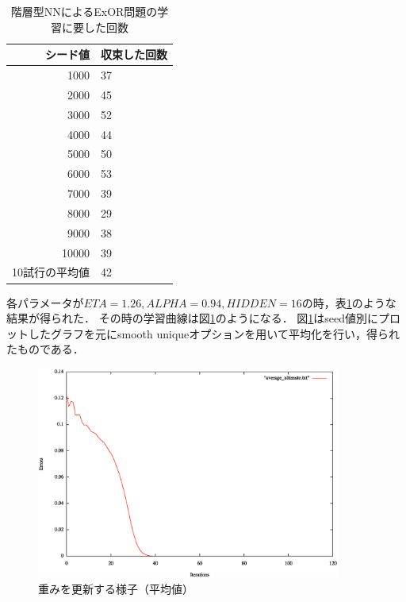 \begin{table}[htb]
 \begin{center}
  \begin{tabular}[htb]{|r|l|} \hline
   シード値 & 収束した回数 \\ \hline \hline
   1000     & 37\\ \hline
   2000     & 45\\ \hline
   3000     & 52\\ \hline
   4000     & 44\\ \hline
   5000     & 50\\ \hline
   6000     & 53\\ \hline
   7000     & 39\\ \hline
   8000     & 29\\ \hline
   9000     & 38\\ \hline
   10000    & 39 \\ \hline \hline
   10試行の平均値 & 42 \\ \hline
  \end{tabular}
  \caption{階層型NNによるExOR問題の学習に要した回数}
  \label{table:level2}
 \end{center}
\end{table}

各パラメータが$ETA=1.26, ALPHA=0.94, HIDDEN=16$の時，表\ref{table:level2}のような結果が得られた．
その時の学習曲線は図\ref{fig:averageultimate}のようになる．
図\ref{fig:averageultimate}はseed値別にプロットしたグラフを元にsmooth uniqueオプションを用いて平均化を行い，得られたものである．

\begin{figure}[h]
 \begin{center}
  \includegraphics[width=10.0cm]{./level2figs/averageultimate.eps}
  \caption{重みを更新する様子（平均値）}
  \label{fig:averageultimate}
 \end{center}
\end{figure}


